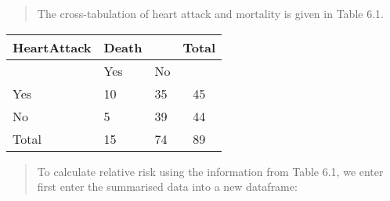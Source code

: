 \documentclass[
]{memoir}
\newenvironment{Shaded}{\begin{snugshade}}{\end{snugshade}}
\newcommand{\AttributeTok}[1]{\textcolor[rgb]{0.77,0.63,0.00}{#1}}
\newcommand{\DecValTok}[1]{\textcolor[rgb]{0.00,0.00,0.81}{#1}}
\newcommand{\FunctionTok}[1]{\textcolor[rgb]{0.00,0.00,0.00}{#1}}
\newcommand{\NormalTok}[1]{#1}
\newcommand{\OtherTok}[1]{\textcolor[rgb]{0.56,0.35,0.01}{#1}}
\newcommand{\SpecialCharTok}[1]{\textcolor[rgb]{0.00,0.00,0.00}{#1}}
\newcommand{\StringTok}[1]{\textcolor[rgb]{0.31,0.60,0.02}{#1}}
\begin{document}
\begin{quote}
The cross-tabulation of heart attack and mortality is given in Table 6.1.
\end{quote}

\begin{longtable}[]{@{}lllc@{}}
\toprule()
HeartAttack & Death & & Total \\
\midrule()
\endhead
& Yes & No & \\
Yes & 10 & 35 & 45 \\
No & 5 & 39 & 44 \\
Total & 15 & 74 & 89 \\
\bottomrule()
\end{longtable}

\begin{quote}
To calculate relative risk using the information from Table 6.1, we enter first enter the summarised data into a new dataframe:
\end{quote}

\begin{Shaded}
\end{Shaded}
\end{document}
